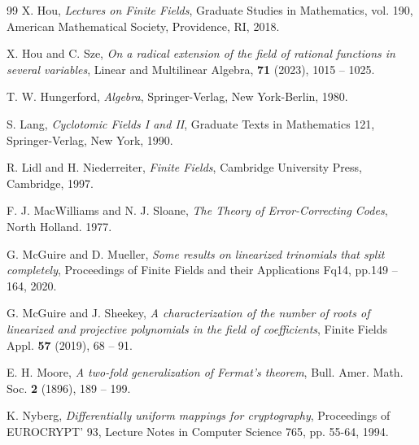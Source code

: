 \documentclass{amsart}
\numberwithin{equation}{section}
\theoremstyle{definition}
\begin{document}
\begin{thebibliography}{99}
X. Hou, {\it Lectures on Finite Fields}, Graduate Studies in Mathematics, vol. 190, American Mathematical Society, Providence, RI, 2018.

X. Hou and C. Sze, {\it On a radical extension of the field of rational functions in several variables}, Linear and Multilinear Algebra, {\bf 71} (2023), 1015 -- 1025. 

T. W. Hungerford, {\it Algebra},  Springer-Verlag, New York-Berlin, 1980.


 S. Lang, {\em Cyclotomic Fields I and II}, Graduate
Texts in Mathematics 121, Springer-Verlag, New York, 1990.

R. Lidl and H. Niederreiter, {\it Finite Fields},  Cambridge University Press, Cambridge, 1997.

  F. J. MacWilliams and N. J. Sloane, {\em The Theory of Error-Correcting Codes},  North Holland. 1977.


 G. McGuire and D. Mueller, {\it Some results on linearized trinomials that split completely}, Proceedings of Finite Fields and their Applications Fq14, pp.149 -- 164, 2020.

 G. McGuire and J. Sheekey, {\it A characterization of the number of roots of linearized and projective polynomials in the field of coefficients}, Finite Fields Appl. {\bf 57} (2019), 68 -- 91.


E. H. Moore, {\it A two-fold generalization of Fermat's theorem}, Bull. Amer. Math. Soc. {\bf 2} (1896), 189 -- 199.


 K. Nyberg, {\it Differentially uniform mappings for
cryptography}, Proceedings of EUROCRYPT' 93, Lecture Notes  in Computer
Science 765, pp. 55-64, 1994.
\end{thebibliography}

\end{document}
